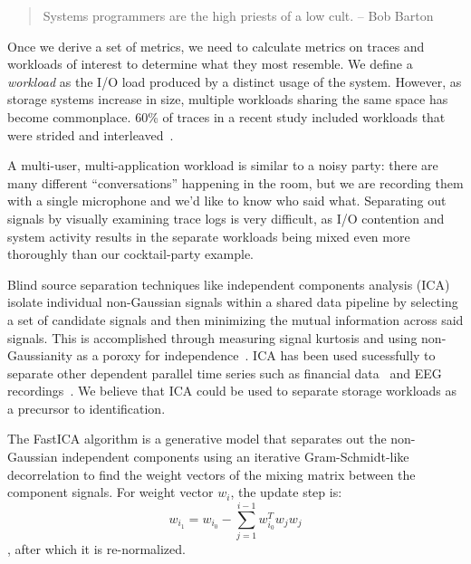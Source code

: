 \begin{quote}
Systems programmers are the high priests of a low cult.
-- Bob Barton
\end{quote}



Once we derive a set of metrics, we need to calculate metrics on traces and
workloads of interest to determine what \mw they most resemble.  We define 
a \textit{workload} as the I/O load produced by a distinct usage of the system.  
However, as storage systems increase in size, multiple workloads sharing the
same space has become commonplace.  
60\% of traces in a recent study included workloads that were strided and
interleaved~\cite{seo_char}.  

 A multi-user, multi-application workload is similar to a
noisy party: there are many different ``conversations'' happening in the room,
but we are recording them with a single microphone and we'd like to know who
said what.  Separating out signals by visually examining trace logs is very
difficult, as I/O contention and system activity results in the separate
workloads being mixed even more thoroughly than our cocktail-party example.

Blind source separation techniques like independent components
analysis (ICA) isolate individual non-Gaussian
signals within a shared data pipeline by selecting a set of candidate signals
and then minimizing the mutual information across said signals.  This is accomplished through measuring signal kurtosis and using non-Gaussianity as a poroxy for independence~\cite{hyvarinen2004independent}.  ICA has been used sucessfully to separate other dependent parallel time series such as financial data~\cite{hyvarinen2004independent} and EEG recordings~\cite{vigario2000independent}.
We believe that ICA could be used to separate storage workloads as a precursor to
identification.

The FastICA algorithm is a generative model that separates out the non-Gaussian independent components using an iterative Gram-Schmidt-like decorrelation to find the weight vectors of the mixing matrix between the component signals.  For weight vector $w_i$, the update step is: 
\begin{equation}
    w_{i_1} = w_{i_0}-\sum_{j=1}^{i-1} w_{i_0}^Tw_jw_j
\end{equation}
, after which it is re-normalized.

